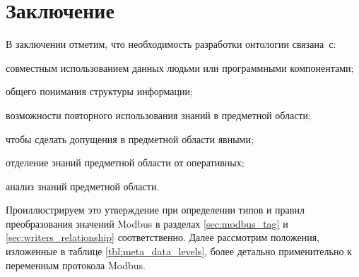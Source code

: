 \section*{Заключение}
В заключении отметим, что необходимость разработки онтологии связана~с:
\begin{enumerate*}[label=\arabic*\upshape)]
    \item совместным использованием данных людьми или программными компонентами;
    \item общего понимания структуры информации;
    \item возможности повторного использования знаний в предметной области;
    \item чтобы сделать допущения в предметной области явными;
    \item отделение знаний предметной области от оперативных;
    \item анализ знаний предметной области.
\end{enumerate*}

Проиллюстрируем это утверждение при определении типов и правил преобразования
значений Modbus в разделах \ref{sec:modbus_tag} и \ref{sec:writers_relationship} соответственно.
Далее рассмотрим положения, изложенные в таблице \ref{tbl:meta_data_levels}, более детально применительно к переменным протокола Modbus.
